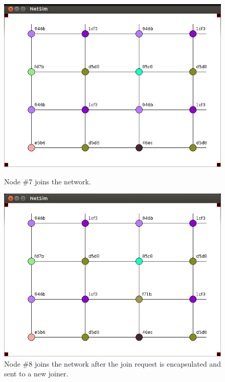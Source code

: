\documentclass[ %
                    author={Luke Murray},
                supervisor={Dr. Simon Hollis},
                     title={Shadow Peer-to-Peer Networks},
                  subtitle={},
                    degree={MEng},
                      year={2013} ]{thesis}
\begin{document}
\begin{figure}[h]
    \begin{minipage}[b]{0.45\linewidth}
        \centering
        \includegraphics[width=\linewidth]{sim_pics/expand_9.png}
        \caption{Node \#7 joins the network.}
        \label{sim_expand9}
    \end{minipage}
    \hspace{0.5cm}
    \begin{minipage}[b]{0.45\linewidth}
        \centering
        \includegraphics[width=\linewidth]{sim_pics/expand_10.png}
        \caption{Node \#8 joins the network after the join request is encapsulated and sent to a new joiner.}
        \label{sim_expand10}
    \end{minipage}
\end{figure}
\end{document}
